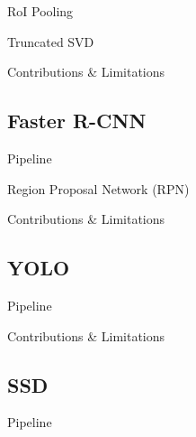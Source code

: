 \documentclass[xcolor=dvipsnames,aspectratio=169]{beamer}
\begin{document}
            \begin{frame}{RoI Pooling}
                
            \end{frame}

            \begin{frame}{Truncated SVD}
                
            \end{frame}

            \begin{frame}{Contributions \& Limitations}
                
            \end{frame}

        \subsection{Faster R-CNN}
            \begin{frame}{Pipeline}
                
            \end{frame}

            \begin{frame}{Region Proposal Network (RPN)}
                
            \end{frame}

            \begin{frame}{Contributions \& Limitations}
                
            \end{frame}

        \subsection{YOLO}
            \begin{frame}{Pipeline}
                
            \end{frame}

            \begin{frame}{Contributions \& Limitations}
                
            \end{frame}

        \subsection{SSD}
            \begin{frame}{Pipeline}
                
            \end{frame}
\end{document}
